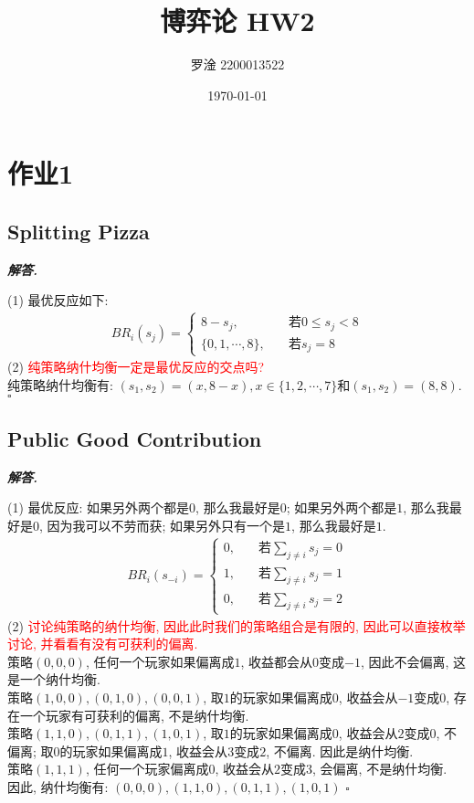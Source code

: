 \documentclass[10pt, a4paper, oneside]{ctexart}
\title{\textbf{博弈论 HW2}}
\author{罗淦 2200013522}
\date{\today}
\newenvironment{solution}{%
  \par\noindent\textbf{\textit{解答. }}\ignorespaces
}{%
  \hfill\ensuremath{\square}\par %
}
\begin{document}
\maketitle


\section{作业1}

\subsection{Splitting Pizza}
\begin{solution}
(1) 最优反应如下:
\begin{align*}
    BR_i(s_j)=\begin{cases}
        8-s_j, &\quad \text{若} 0\leq s_j<8\\
        \{0,1,\cdots,8\}, &\quad \text{若} s_j=8
    \end{cases}
\end{align*}
(2) \textcolor{red}{纯策略纳什均衡一定是最优反应的交点吗?}\\
纯策略纳什均衡有: $(s_1,s_2)=(x,8-x), x\in \{1,2,\cdots,7\}$和$(s_1,s_2)=(8,8)$.
\end{solution}

\subsection{Public Good Contribution}
\begin{solution}
(1) 最优反应: 如果另外两个都是$0$, 那么我最好是$0$; 如果另外两个都是$1$, 那么我最好是$0$, 因为我可以不劳而获; 如果另外只有一个是$1$, 那么我最好是$1$.
\begin{align*}
    BR_i(s_{-i})=\begin{cases}
        0,&\quad \text{若}\sum_{j\neq i}s_j=0\\
        1,&\quad \text{若}\sum_{j\neq i}s_j=1\\
        0,&\quad \text{若}\sum_{j\neq i}s_j=2
    \end{cases}
\end{align*}
(2) \textcolor{red}{讨论纯策略的纳什均衡, 因此此时我们的策略组合是有限的, 因此可以直接枚举讨论, 并看看有没有可获利的偏离.}\\
策略$(0,0,0)$, 任何一个玩家如果偏离成$1$, 收益都会从$0$变成$-1$, 因此不会偏离, 这是一个纳什均衡.\\
策略$(1,0,0),(0,1,0),(0,0,1)$, 取$1$的玩家如果偏离成$0$, 收益会从$-1$变成$0$, 存在一个玩家有可获利的偏离, 不是纳什均衡.\\
策略$(1,1,0),(0,1,1),(1,0,1)$, 取$1$的玩家如果偏离成$0$, 收益会从$2$变成$0$, 不偏离; 取$0$的玩家如果偏离成$1$, 收益会从$3$变成$2$, 不偏离. 因此是纳什均衡.\\
策略$(1,1,1)$, 任何一个玩家偏离成$0$, 收益会从$2$变成$3$, 会偏离, 不是纳什均衡.\\
因此, 纳什均衡有: $(0,0,0),(1,1,0),(0,1,1),(1,0,1)$
\end{solution}
\end{document}
